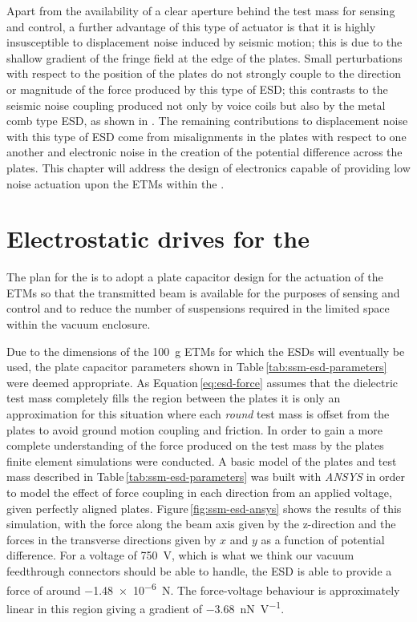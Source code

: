 Apart from the availability of a clear aperture behind the test mass for sensing and control, a further advantage of this type of actuator is that it is highly insusceptible to displacement noise induced by seismic motion; this is due to the shallow gradient of the fringe field at the edge of the plates. Small perturbations with respect to the position of the plates do not strongly couple to the direction or magnitude of the force produced by this type of \gls{ESD}; this contrasts to the seismic noise coupling produced not only by voice coils but also by the metal comb type \gls{ESD}, as shown in \cite{Wittel2015}. The remaining contributions to displacement noise with this type of \gls{ESD} come from misalignments in the plates with respect to one another and electronic noise in the creation of the potential difference across the plates. This chapter will address the design of electronics capable of providing low noise actuation upon the \glspl{ETM} within the \SSMEXPT{}.

\section{Electrostatic drives for the \SSMEXPT{}}
The plan for the \SSMEXPT{} is to adopt a plate capacitor design for the actuation of the \glspl{ETM} so that the transmitted beam is available for the purposes of sensing and control and to reduce the number of suspensions required in the limited space within the vacuum enclosure.

Due to the dimensions of the \SI{100}{\gram} \glspl{ETM} for which the \glspl{ESD} will eventually be used, the plate capacitor parameters shown in Table\,\ref{tab:ssm-esd-parameters} were deemed appropriate. As Equation\,\ref{eq:esd-force} assumes that the dielectric test mass completely fills the region between the plates it is only an approximation for this situation where each \emph{round} test mass is offset from the plates to avoid ground motion coupling and friction. In order to gain a more complete understanding of the force produced on the test mass by the plates finite element simulations were conducted. A basic model of the plates and test mass described in Table\,\ref{tab:ssm-esd-parameters} was built with \emph{ANSYS} in order to model the effect of force coupling in each direction from an applied voltage, given perfectly aligned plates. Figure\,\ref{fig:ssm-esd-ansys} shows the results of this simulation, with the force along the beam axis given by the z-direction and the forces in the transverse directions given by $x$ and $y$ as a function of potential difference. For a voltage of \SI{750}{\volt}, which is what we think our vacuum feedthrough connectors should be able to handle, the \gls{ESD} is able to provide a force of around \SI{-1.48e-6}{\newton}. The force-voltage behaviour is approximately linear in this region giving a gradient of \SI{-3.68}{\nano\newton\per\volt}.

